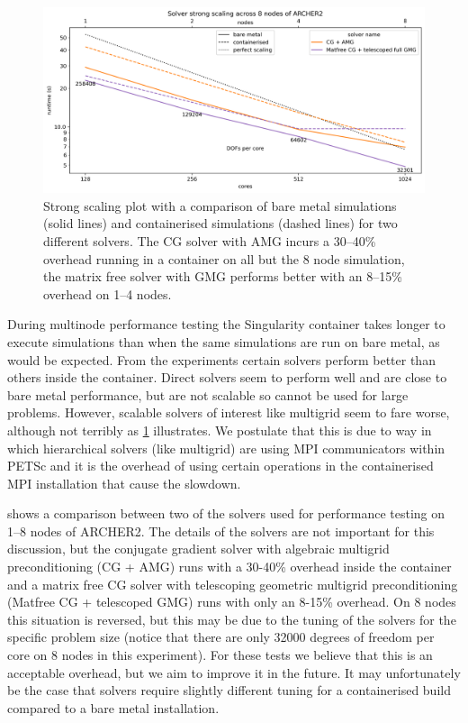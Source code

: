 \documentclass[a4paper,11pt]{article}
\begin{document}
\begin{figure}[htp]
	\centering
	\includegraphics[width=\textwidth]{strong.png}
	\vspace{-1em}
	\caption{Strong scaling plot with a comparison of bare metal simulations (solid lines) and containerised simulations (dashed lines) for two different solvers. The CG solver with AMG incurs a 30--40\% overhead running in a container on all but the 8 node simulation, the matrix free solver with GMG performs better with an 8--15\% overhead on 1--4 nodes.}
	\label{fig:sing_perf}
\end{figure}
During multinode performance testing the Singularity container takes longer to execute simulations than when the same simulations are run on bare metal, as would be expected.
From the experiments certain solvers perform better than others inside the container.
Direct solvers seem to perform well and are close to bare metal performance, but are not scalable so cannot be used for large problems.
However, scalable solvers of interest like multigrid seem to fare worse, although not terribly as \cref{fig:sing_perf} illustrates.
We postulate that this is due to way in which hierarchical solvers (like multigrid) are using MPI communicators within PETSc and it is the overhead of using certain operations in the containerised MPI installation that cause the slowdown.

 shows a comparison between two of the solvers used for performance testing on 1--8 nodes of ARCHER2.
The details of the solvers are not important for this discussion, but the conjugate gradient solver with algebraic multigrid preconditioning (CG + AMG) runs with a 30-40\% overhead inside the container and a matrix free CG solver with telescoping geometric multigrid preconditioning (Matfree CG + telescoped GMG) runs with only an 8-15\% overhead.
On 8 nodes this situation is reversed, but this may be due to the tuning of the solvers for the specific problem size (notice that there are only 32000 degrees of freedom per core on 8 nodes in this experiment).
For these tests we believe that this is an acceptable overhead, but we aim to improve it in the future.
It may unfortunately be the case that solvers require slightly different tuning for a containerised build compared to a bare metal installation.
\end{document}
